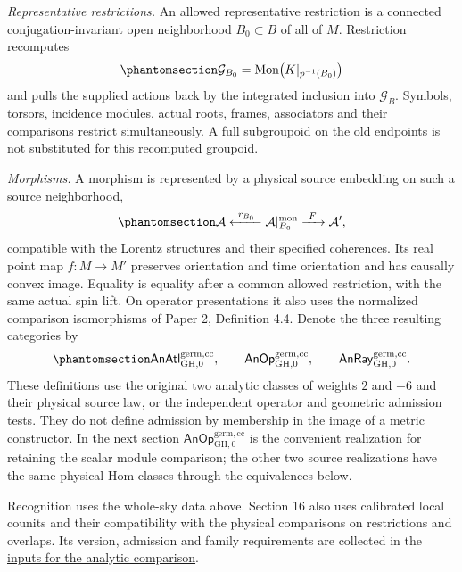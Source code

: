 \documentclass[
  english,
  11pt,
  reqno]{amsart}
\begin{document}
\emph{Representative restrictions.} An allowed representative
restriction is a connected conjugation-invariant open neighborhood
\(B_0\subset B\) of all of \(M\). Restriction recomputes
\begin{equation}\protect\phantomsection\label{eq:analytic-real-germ-recomputed-groupoid}{
\mathcal G_{B_0}
=\operatorname{Mon}\bigl(K|_{p^{-1}(B_0)}\bigr)
}\end{equation} and pulls the supplied actions back by the integrated
inclusion into \(\mathcal G_B\). Symbols, torsors, incidence modules,
actual roots, frames, associators and their comparisons restrict
simultaneously. A full subgroupoid on the old endpoints is not
substituted for this recomputed groupoid.

\emph{Morphisms.} A morphism is represented by a physical source
embedding on such a source neighborhood,
\begin{equation}\protect\phantomsection\label{eq:analytic-real-germ-roof}{
\mathcal A
\xleftarrow{\ r_{B_0}\ }
\mathcal A|^{\mathrm{mon}}_{B_0}
\xrightarrow{\ F\ }
\mathcal A',
}\end{equation} compatible with the Lorentz structures and their
specified coherences. Its real point map \(f:M\to M'\) preserves
orientation and time orientation and has causally convex image. Equality
is equality after a common allowed restriction, with the same actual
spin lift. On operator presentations it also uses the normalized
comparison isomorphisms of Paper 2, Definition 4.4. Denote the three
resulting categories by
\begin{equation}\protect\phantomsection\label{eq:unmarked-analytic-source-categories}{
\mathsf{AnAtl}^{\mathrm{germ},\mathrm{cc}}_{\mathrm{GH},0},
\qquad
\mathsf{AnOp}^{\mathrm{germ},\mathrm{cc}}_{\mathrm{GH},0},
\qquad
\mathsf{AnRay}^{\mathrm{germ},\mathrm{cc}}_{\mathrm{GH},0}.
}\end{equation} These definitions use the original two analytic classes
of weights \(2\) and \(-6\) and their physical source law, or the
independent operator and geometric admission tests. They do not define
admission by membership in the image of a metric constructor. In the
next section
\(\mathsf{AnOp}^{\mathrm{germ},\mathrm{cc}}_{\mathrm{GH},0}\) is the
convenient realization for retaining the scalar module comparison; the
other two source realizations have the same physical Hom classes through
the equivalences below.

Recognition uses the whole-sky data above. Section 16 also uses
calibrated local counits and their compatibility with the physical
comparisons on restrictions and overlaps. Its version, admission and
family requirements are collected in the
\hyperref[sec:analytic-interface-input-contract]{inputs for the analytic
comparison}.
\end{document}
